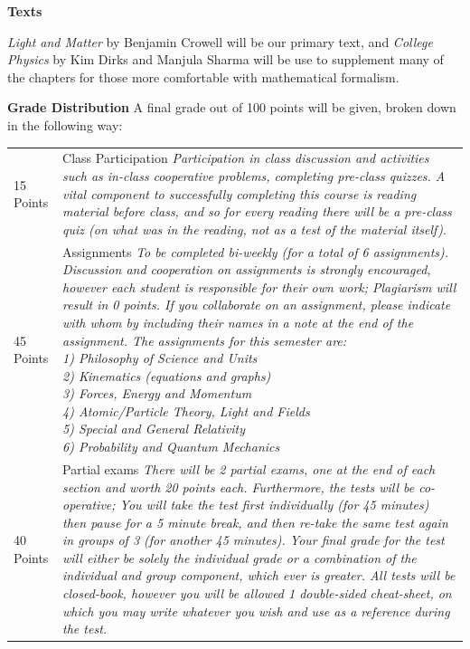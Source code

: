 \documentclass[12pt]{article}
\begin{document}
\noindent \textbf{Texts}

\textit{Light and Matter} by Benjamin Crowell will be our primary text, and \textit{College Physics} by Kim Dirks and Manjula Sharma will be use to supplement many of the chapters for those more comfortable with mathematical formalism.\newline

 \clearpage
 \noindent \textbf{Grade Distribution}\newline
A final grade out of 100 points will be given, broken down in the following way:
\begin{center}
\begin{tabularx}{0.8\textwidth}{l X}
15 Points & Class Participation \newline \textit{Participation in class discussion and activities such as  in-class cooperative problems, completing pre-class quizzes. A vital component to successfully completing this course is reading material before class, and so for every reading there will be a pre-class quiz (on what was in the reading, not as a test of the material itself).} \\
45 Points & Assignments \newline \textit{To be completed bi-weekly (for a total of 6 assignments). Discussion and cooperation on assignments is strongly encouraged, however each student is responsible for their own work; Plagiarism will result in 0 points. If you collaborate on an assignment, please indicate with whom by including their names in a note at the end of the assignment. The assignments for this semester are: \newline \hspace{0.25in}1) Philosophy of Science and Units \newline 2) Kinematics (equations and graphs) \newline 3) Forces, Energy and Momentum \newline 4) Atomic/Particle Theory, Light and Fields \newline 5) Special and General Relativity \newline 6) Probability and Quantum Mechanics} \\
40 Points & Partial exams \newline \textit{There will be 2 partial exams, one at the end of each section and worth 20 points each. Furthermore, the tests will be co-operative; You will take the test first individually (for 45 minutes) then pause for a 5 minute break, and then re-take the same test again in groups of 3 (for another 45 minutes). Your final grade for the test will either be solely the individual grade or a combination of the individual and group component, which ever is greater. All tests will be closed-book, however you will be allowed 1 double-sided cheat-sheet, on which you may write whatever you wish and use as a reference during the test.} \\
\end{tabularx}
\end{center}
\end{document}
